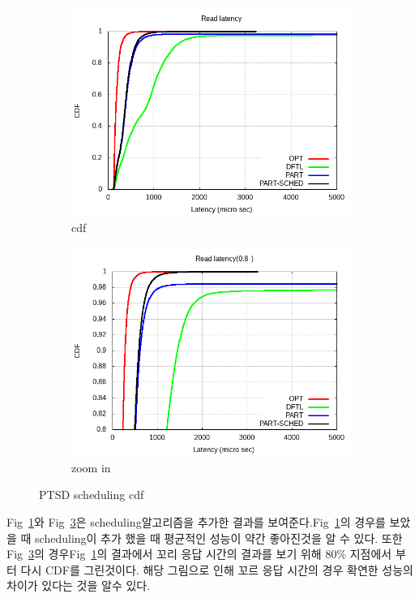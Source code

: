 \documentclass[conference]{IEEEtran}
\begin{document}
\begin{figure}[hbt]
	\centering
	\begin{subfigure}[b]{0.3\textwidth}	
		\includegraphics[width=\linewidth]{image/EVAL/cdf2.png}
		\caption{cdf} \label{fig:cdf2}
	\end{subfigure}
	\begin{subfigure}[b]{0.3\textwidth}	
		\includegraphics[width=\linewidth]{image/EVAL/cdf2_zoom.png}
		\caption{zoom in} \label{fig:cdf2_zoom}
	\end{subfigure}
	\caption{PTSD scheduling cdf}
\end{figure}
Fig~\ref{fig:cdf2}와 Fig~\ref{fig:cdf2_zoom}은 scheduling알고리즘을 추가한 결과를 보여준다.Fig~\ref{fig:cdf2}의 경우를 보았을 때 scheduling이 추가 했을 때 평균적인 성능이 약간 좋아진것을 알 수 있다. 또한 Fig~\ref{fig:cdf2_zoom}의 경우Fig~\ref{fig:cdf2}의 결과에서 꼬리 응답 시간의 결과를 보기 위해 80\% 지점에서 부터 다시 CDF를 그린것이다. 해당 그림으로 인해 꼬르 응답 시간의 경우 확연한 성능의 차이가 있다는 것을 알수 있다.
\end{document}
